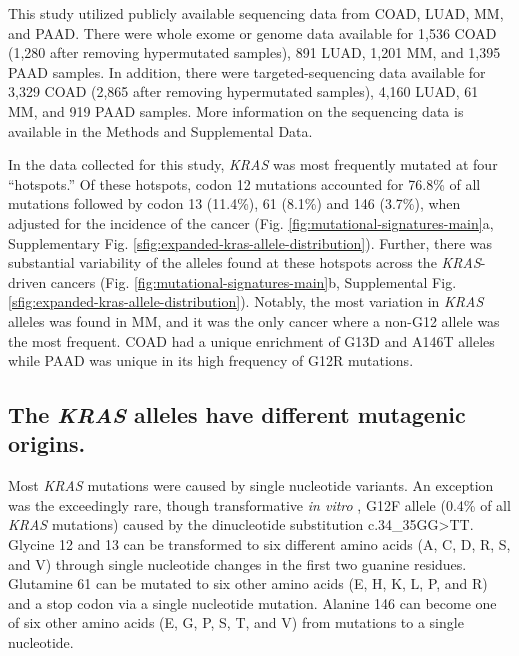 \documentclass[english, 10pt, letterpaper]{article}
\newcommand{\KRAS}{\emph{KRAS}}
\begin{document}
This study utilized publicly available sequencing data from COAD, LUAD, MM, and PAAD.
There were whole exome or genome data available for 1,536 COAD (1,280 after removing hypermutated samples), 891 LUAD, 1,201 MM, and 1,395 PAAD samples.
In addition, there were targeted-sequencing data available for 3,329 COAD (2,865 after removing hypermutated samples), 4,160 LUAD, 61 MM, and 919 PAAD samples.
More information on the sequencing data is available in the Methods and Supplemental Data.

In the data collected for this study, \KRAS{} was most frequently mutated at four “hotspots.” 
Of these hotspots, codon 12 mutations accounted for 76.8\% of all mutations followed by codon 13 (11.4\%), 61 (8.1\%) and 146 (3.7\%), when adjusted for the incidence of the cancer (Fig. \ref{fig:mutational-signatures-main}a, Supplementary Fig. \ref{sfig:expanded-kras-allele-distribution}).
Further, there was substantial variability of the alleles found at these hotspots across the \KRAS{}-driven cancers (Fig. \ref{fig:mutational-signatures-main}b, Supplemental Fig. \ref{sfig:expanded-kras-allele-distribution}). 
Notably, the most variation in \KRAS{} alleles was found in MM, and it was the only cancer where a non-G12 allele was the most frequent. 
COAD had a unique enrichment of G13D and A146T alleles while PAAD was unique in its high frequency of G12R mutations.


\subsection*{The \KRAS{} alleles have different mutagenic origins.}

Most \KRAS{} mutations were caused by single nucleotide variants.
An exception was the exceedingly rare, though transformative \emph{in vitro} \cite{Barbacid1987}, G12F allele (0.4\% of all \KRAS{} mutations) caused by the dinucleotide substitution c.34\_35GG>TT.
Glycine 12 and 13 can be transformed to six different amino acids (A, C, D, R, S, and V) through single nucleotide changes in the first two guanine residues.
Glutamine 61 can be mutated to six other amino acids (E, H, K, L, P, and R) and a stop codon via a single nucleotide mutation.
Alanine 146 can become one of six other amino acids (E, G, P, S, T, and V) from mutations to a single nucleotide.
\end{document}
